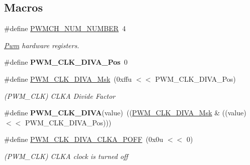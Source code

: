 \subsection*{Macros}
\begin{DoxyCompactItemize}
\item 
\mbox{\label{group__SAMS70__PWM_gaac490ccca2dabf7952b692754e13ef7a}} 
\#define \mbox{\hyperlink{group__SAMS70__PWM_gaac490ccca2dabf7952b692754e13ef7a}{P\+W\+M\+C\+H\+\_\+\+N\+U\+M\+\_\+\+N\+U\+M\+B\+ER}}~4
\begin{DoxyCompactList}\small\item\em \mbox{\hyperlink{structPwm}{Pwm}} hardware registers. \end{DoxyCompactList}\item 
\mbox{\label{group__SAMS70__PWM_gafd838365b1e8ff1cd90d647ab9f91bc8}} 
\#define {\bfseries P\+W\+M\+\_\+\+C\+L\+K\+\_\+\+D\+I\+V\+A\+\_\+\+Pos}~0
\item 
\mbox{\label{group__SAMS70__PWM_ga89c8665c750fe9e496bb150cfac30cd6}} 
\#define \mbox{\hyperlink{group__SAMS70__PWM_ga89c8665c750fe9e496bb150cfac30cd6}{P\+W\+M\+\_\+\+C\+L\+K\+\_\+\+D\+I\+V\+A\+\_\+\+Msk}}~(0xffu $<$$<$ P\+W\+M\+\_\+\+C\+L\+K\+\_\+\+D\+I\+V\+A\+\_\+\+Pos)
\begin{DoxyCompactList}\small\item\em (P\+W\+M\+\_\+\+C\+LK) C\+L\+KA Divide Factor \end{DoxyCompactList}\item 
\mbox{\label{group__SAMS70__PWM_ga16461ed8470a94e042b6b0c7b1eac316}} 
\#define {\bfseries P\+W\+M\+\_\+\+C\+L\+K\+\_\+\+D\+I\+VA}(value)~((\mbox{\hyperlink{group__SAMV71__PWM_ga89c8665c750fe9e496bb150cfac30cd6}{P\+W\+M\+\_\+\+C\+L\+K\+\_\+\+D\+I\+V\+A\+\_\+\+Msk}} \& ((value) $<$$<$ P\+W\+M\+\_\+\+C\+L\+K\+\_\+\+D\+I\+V\+A\+\_\+\+Pos)))
\item 
\mbox{\label{group__SAMS70__PWM_gaf333c9ff5302685fd4ef18860428d30b}} 
\#define \mbox{\hyperlink{group__SAMS70__PWM_gaf333c9ff5302685fd4ef18860428d30b}{P\+W\+M\+\_\+\+C\+L\+K\+\_\+\+D\+I\+V\+A\+\_\+\+C\+L\+K\+A\+\_\+\+P\+O\+FF}}~(0x0u $<$$<$ 0)
\begin{DoxyCompactList}\small\item\em (P\+W\+M\+\_\+\+C\+LK) C\+L\+KA clock is turned off \end{DoxyCompactList}\item 
$$
\end{DoxyCompactItemize}
